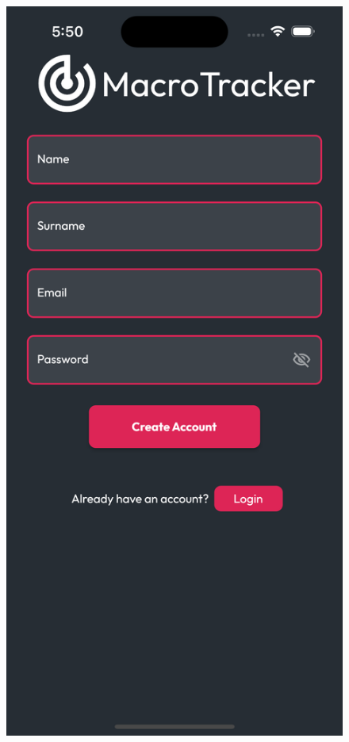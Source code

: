 \documentclass{Configuration_Files/PoliMi3i_thesis}
\begin{document}
\begin{figure}[!h]
  \centering
  \includegraphics[scale=0.1]{Images/Screenshots/Mobile/Register.png}

\end{figure}
\end{document}
